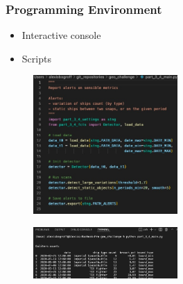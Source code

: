 \begin{frame}\frametitle{Programming Environment}

   \begin{minipage}{0.4\linewidth}
      \begin{itemize}
         \item Interactive console   
         \item Scripts
      \end{itemize}
   \end{minipage}
   \begin{minipage}{0.58\linewidth}
      \begin{figure}[H]
         \includegraphics[width=5.5cm]{../images/illustrations/script.jpg}
      \end{figure}
      \begin{figure}[H]
         \includegraphics[width=5.5cm]{../images/illustrations/launch_script.jpg}
      \end{figure}
   \end{minipage}
\end{frame}


